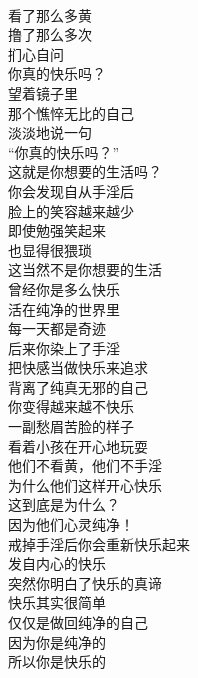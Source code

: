 \begin{poem}[手淫的你真的快乐吗？]
    \begin{multicols}{3}
        \centering~\\
        看了那么多黄 \\ 撸了那么多次 \\ 扪心自问 \\ 你真的快乐吗？ \\ 望着镜子里 \\ 那个憔悴无比的自己 \\ 淡淡地说一句 \\ “你真的快乐吗？” \\ 这就是你想要的生活吗？ \\ 你会发现自从手淫后 \\ 脸上的笑容越来越少 \\ 即使勉强笑起来 \\ 也显得很猥琐 \\ 这当然不是你想要的生活 \\ 曾经你是多么快乐 \\ 活在纯净的世界里 \\ 每一天都是奇迹 \\ 后来你染上了手淫 \\ 把快感当做快乐来追求 \\ 背离了纯真无邪的自己 \\ 你变得越来越不快乐 \\ 一副愁眉苦脸的样子 \\ 看着小孩在开心地玩耍 \\ 他们不看黄，他们不手淫 \\ 为什么他们这样开心快乐 \\ 这到底是为什么？ \\ 因为他们心灵纯净！ \\ 戒掉手淫后你会重新快乐起来 \\ 发自内心的快乐 \\ 突然你明白了快乐的真谛 \\ 快乐其实很简单 \\ 仅仅是做回纯净的自己 \\ 因为你是纯净的 \\ 所以你是快乐的
    \end{multicols}
\end{poem}

